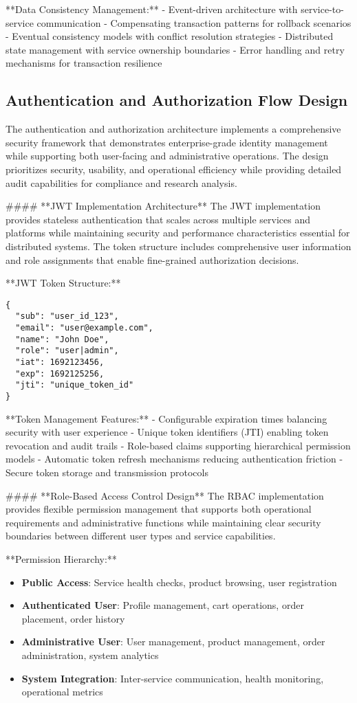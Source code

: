 **Data Consistency Management:**
- Event-driven architecture with service-to-service communication
- Compensating transaction patterns for rollback scenarios
- Eventual consistency models with conflict resolution strategies
- Distributed state management with service ownership boundaries
- Error handling and retry mechanisms for transaction resilience

\subsection{Authentication and Authorization Flow Design}

The authentication and authorization architecture implements a comprehensive security framework that demonstrates enterprise-grade identity management while supporting both user-facing and administrative operations. The design prioritizes security, usability, and operational efficiency while providing detailed audit capabilities for compliance and research analysis.

#### **JWT Implementation Architecture**
The JWT implementation provides stateless authentication that scales across multiple services and platforms while maintaining security and performance characteristics essential for distributed systems. The token structure includes comprehensive user information and role assignments that enable fine-grained authorization decisions.

**JWT Token Structure:**
\begin{verbatim}
{
  "sub": "user_id_123",
  "email": "user@example.com", 
  "name": "John Doe",
  "role": "user|admin",
  "iat": 1692123456,
  "exp": 1692125256,
  "jti": "unique_token_id"
}
\end{verbatim}

**Token Management Features:**
- Configurable expiration times balancing security with user experience
- Unique token identifiers (JTI) enabling token revocation and audit trails
- Role-based claims supporting hierarchical permission models
- Automatic token refresh mechanisms reducing authentication friction
- Secure token storage and transmission protocols

#### **Role-Based Access Control Design**
The RBAC implementation provides flexible permission management that supports both operational requirements and administrative functions while maintaining clear security boundaries between different user types and service capabilities.

**Permission Hierarchy:**
\begin{itemize}
\item \textbf{Public Access}: Service health checks, product browsing, user registration
\item \textbf{Authenticated User}: Profile management, cart operations, order placement, order history
\item \textbf{Administrative User}: User management, product management, order administration, system analytics
\item \textbf{System Integration}: Inter-service communication, health monitoring, operational metrics
\end{itemize}

